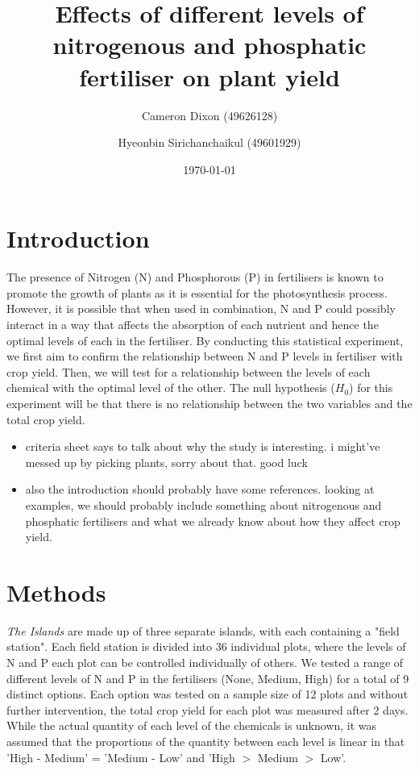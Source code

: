 \documentclass[12pt]{article}
\title{Effects of different levels of nitrogenous and phosphatic fertiliser on plant yield}
\author{Cameron Dixon (49626128)}
\author{Hyeonbin Sirichanchaikul (49601929)}
\affil{The University of Queensland}
\date{\today}
\begin{document}
\maketitle

\section{Introduction}
The presence of Nitrogen (N) and Phosphorous (P) in fertilisers is known to promote the growth of plants as it is essential for the photosynthesis process. 
However, it is possible that when used in combination, N and P could possibly interact in a way that affects the absorption of each nutrient and hence the optimal levels of each in the fertiliser.
By conducting this statistical experiment, we first aim to confirm the relationship between N and P levels in fertiliser with crop yield.
Then, we will test for a relationship between the levels of each chemical with the optimal level of the other.
The null hypothesis ($H_0$) for this experiment will be that there is no relationship between the two variables and the total crop yield.
\begin{itemize}
    \item criteria sheet says to talk about why the study is interesting. i might've messed up by picking plants, sorry about that. good luck
    \item also the introduction should probably have some references. looking at examples, we should probably include something about nitrogenous and phosphatic fertilisers and what we already know about how they affect crop yield.
\end{itemize}


\section{Methods}
\textit{The Islands} are made up of three separate islands, with each containing a "field station".
Each field station is divided into 36 individual plots, where the levels of N and P each plot can be controlled individually of others.
We tested a range of different levels of N and P in the fertilisers (None, Medium, High) for a total of 9 distinct options.
Each option was tested on a sample size of 12 plots and without further intervention, the total crop yield for each plot was measured after 2 days.
While the actual quantity of each level of the chemicals is unknown, it was assumed that the proportions of the quantity between each level is linear in that 'High - Medium' = 'Medium - Low' and 'High $>$ Medium $>$ Low'.
\end{document}
